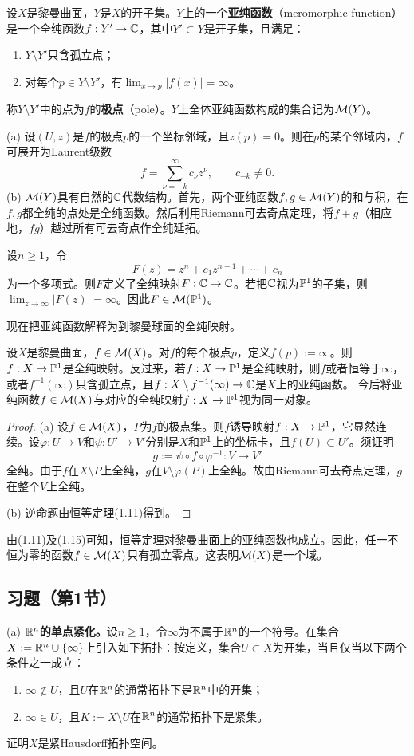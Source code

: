 设$X$是黎曼曲面，$Y$是$X$的开子集。$Y$上的一个\textbf{亚纯函数}（meromorphic function）是一个全纯函数$f:Y'\to\mathbb C$，其中$Y'\subset Y$是开子集，且满足：
\begin{enumerate}[label=(\roman*)]
\item $Y\setminus Y'$只含孤立点；
\item 对每个$p\in Y\setminus Y'$，有$\displaystyle\lim_{x\to p}|f(x)|=\infty$。
\end{enumerate}
称$Y\setminus Y'$中的点为$f$的\textbf{极点}（pole）。$Y$上全体亚纯函数构成的集合记为$\mathcal M(Y)$。

(a) 设$(U,z)$是$f$的极点$p$的一个坐标邻域，且$z(p)=0$。则在$p$的某个邻域内，$f$可展开为Laurent级数
\[
f=\sum_{\nu=-k}^{\infty}c_\nu z^\nu,\qquad c_{-k}\ne0.
\]
(b) $\mathcal M(Y)$具有自然的$\mathbb C$代数结构。首先，两个亚纯函数$f,g\in\mathcal M(Y)$的和与积，在$f,g$都全纯的点处是全纯函数。然后利用Riemann可去奇点定理，将$f+g$（相应地，$fg$）越过所有可去奇点作全纯延拓。

设$n\ge1$，令
\[
F(z)=z^n+c_1z^{n-1}+\cdots+c_n
\]
为一个多项式。则$F$定义了全纯映射$F:\mathbb C\to\mathbb C$。若把$\mathbb C$视为$\mathbb P^1$的子集，则$\lim_{z\to\infty}|F(z)|=\infty$。因此$F\in\mathcal M(\mathbb P^1)$。

现在把亚纯函数解释为到黎曼球面的全纯映射。

设$X$是黎曼曲面，$f\in\mathcal M(X)$。对$f$的每个极点$p$，定义$f(p):=\infty$。则$f:X\to\mathbb P^1$是全纯映射。反过来，若$f:X\to\mathbb P^1$是全纯映射，则$f$或者恒等于$\infty$，或者$f^{-1}(\infty)$只含孤立点，且$f:X\setminus f^{-1}(\infty)\to\mathbb C$是$X$上的亚纯函数。
今后将亚纯函数$f\in\mathcal M(X)$与对应的全纯映射$f:X\to\mathbb P^1$视为同一对象。
\begin{proof}
(a) 设$f\in\mathcal M(X)$，$P$为$f$的极点集。则$f$诱导映射$f:X\to\mathbb P^1$，它显然连续。设$\varphi:U\to V$和$\psi:U'\to V'$分别是$X$和$\mathbb P^1$上的坐标卡，且$f(U)\subset U'$。须证明
\[
g:=\psi\circ f\circ\varphi^{-1}:V\to V'
\]
全纯。由于$f$在$X\setminus P$上全纯，$g$在$V\setminus\varphi(P)$上全纯。故由Riemann可去奇点定理，$g$在整个$V$上全纯。

(b) 逆命题由恒等定理(1.11)得到。
\end{proof}

由(1.11)及(1.15)可知，恒等定理对黎曼曲面上的亚纯函数也成立。因此，任一不恒为零的函数$f\in\mathcal M(X)$只有孤立零点。这表明$\mathcal M(X)$是一个域。

\subsection*{习题（第1节）}
(a) \textbf{$\mathbb R^n$的单点紧化。}设$n\ge1$，令$\infty$为不属于$\mathbb R^n$的一个符号。在集合$X:=\mathbb R^n\cup\{\infty\}$上引入如下拓扑：按定义，集合$U\subset X$为开集，当且仅当以下两个条件之一成立：
\begin{enumerate}[label=(\roman*)]
\item $\infty\notin U$，且$U$在$\mathbb R^n$的通常拓扑下是$\mathbb R^n$中的开集；
\item $\infty\in U$，且$K:=X\setminus U$在$\mathbb R^n$的通常拓扑下是紧集。
\end{enumerate}
证明$X$是紧Hausdorff拓扑空间。

